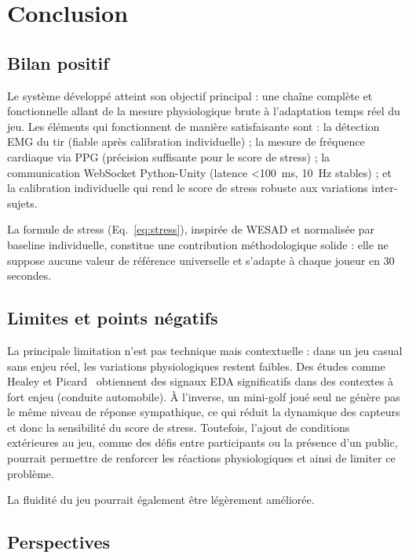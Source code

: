 \documentclass[runningheads]{llncs}
\begin{document}
\section{Conclusion}

\subsection{Bilan positif}

Le système développé atteint son objectif principal : une chaîne complète
et fonctionnelle allant de la mesure physiologique brute à l'adaptation
temps réel du jeu. Les éléments qui fonctionnent de manière satisfaisante
sont : la détection EMG du tir (fiable après calibration individuelle) ;
la mesure de fréquence cardiaque via PPG (précision suffisante pour le
score de stress) ; la communication WebSocket Python-Unity (latence
<100~ms, 10~Hz stables) ; et la calibration individuelle qui rend le
score de stress robuste aux variations inter-sujets.

La formule de stress (Eq.~\ref{eq:stress}), inspirée de WESAD et normalisée
par baseline individuelle, constitue une contribution méthodologique
solide : elle ne suppose aucune valeur de référence universelle et
s'adapte à chaque joueur en 30 secondes.

\subsection{Limites et points négatifs}

La principale limitation n’est pas technique mais contextuelle : dans un jeu casual sans enjeu réel, les variations physiologiques restent faibles. Des études comme Healey et Picard~\cite{healey2005} obtiennent des signaux EDA significatifs dans des contextes à fort enjeu (conduite automobile). À l’inverse, un mini-golf joué seul ne génère pas le même niveau de réponse sympathique, ce qui réduit la dynamique des capteurs et donc la sensibilité du score de stress. Toutefois, l’ajout de conditions extérieures au jeu, comme des défis entre participants ou la présence d’un public, pourrait permettre de renforcer les réactions physiologiques et ainsi de limiter ce problème.

La fluidité du jeu pourrait également être légèrement améliorée.

\subsection{Perspectives}
\end{document}

